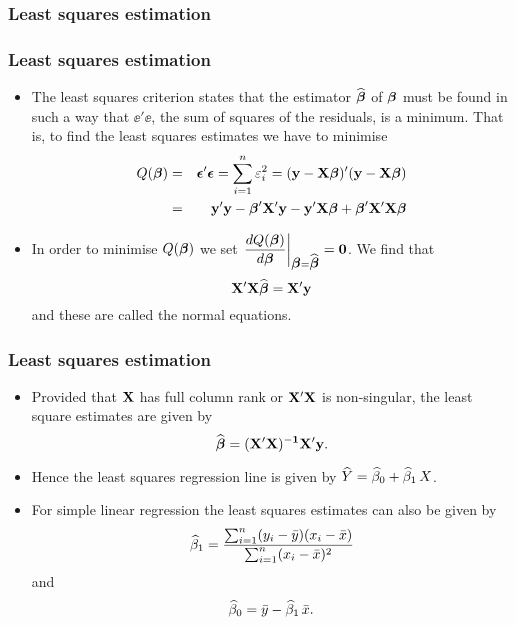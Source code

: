 \documentclass{beamer}
\begin{document}
\subsubsection{Least squares estimation}
\begin{frame}\frametitle{Least squares estimation}
\begin{itemize}
\item The least squares criterion states that the estimator $\widehat{\mbox{\boldmath $\beta$}}$ of $\mbox{\boldmath $\beta$}$ must be found in such a way that $\ee'\ee$, the sum of squares of the residuals, is a minimum. That is, to find the least squares estimates we have to minimise
\begin{eqnarray*}
Q(\mbox{\boldmath $\beta$})  & = & \mbox{\boldmath $\epsilon$}'\mbox{\boldmath $\epsilon$} = \sum_{i=1}^n\varepsilon_i^2 = ({\bf y- X} \mbox{\boldmath $\beta$})'{\bf (y-X}\mbox{\boldmath $\beta$}) \\
        & = & {\bf y'y} -\mbox{\boldmath $\beta$}'{\bf X' y} -{\bf y' X}\mbox{\boldmath $\beta$}+\mbox{\boldmath $\beta$}'{\bf X' X}\mbox{\boldmath $\beta$}
\end{eqnarray*}
\item  In order to minimise $Q(\mbox{\boldmath $\beta$})$ we set $\left.\displaystyle\frac{d Q(\mbox{\boldmath $\beta$})}{d\mbox{\boldmath $\beta$}}\right|_{\mbox{\boldmath $\beta$}=\widehat{\mbox{\boldmath $\beta$}}} ={\bf 0}$. We find that
$$
 {\bf X'X} \widehat{\mbox{\boldmath $\beta$}} = {\bf X'y}
$$
and these are called the normal equations.
\end{itemize}
\end{frame}

\begin{frame}\frametitle{Least squares estimation}
\begin{itemize}
\item Provided that ${\bf X}$ has full column rank or ${\bf X}'{\bf X}$ is non-singular, the least square estimates are given by
$$
\widehat{\mbox{\boldmath $\beta$}} ={ \bf (X'X)^{-1} X'y}.
$$
\item Hence the least squares regression line is given by $\widehat{Y} = \widehat{\beta}_0 + \widehat{\beta}_1\,X$.
\item For simple linear regression the least squares estimates can also be given by
$$
\widehat{\beta}_1 = \frac{\sum_{i=1}^n(y_i - \bar{y})(x_i - \bar{x})}{\sum_{i=1}^n(x_i - \bar{x})^2}
$$
and
$$
\widehat{\beta}_0 = \bar{y} - \widehat{\beta}_1\,\bar{x}.
$$
\end{itemize}
\end{frame}
\end{document}
